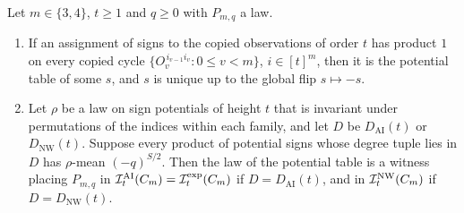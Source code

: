 \begin{lemma}\label{lem:potentials}
Let $m\in\{3,4\}$, $t\ge1$ and $q\ge0$ with $P_{m,q}$ a law.
\begin{enumerate}[label=(\roman*),nosep]
\item If an assignment of signs to the copied observations of order $t$ has product $1$ on every copied cycle $\{O_v^{\,i_{v-1}i_v}:0\le v<m\}$, $i\in[t]^m$, then it is the potential table of some $s$, and $s$ is unique up to the global flip $s\mapsto-s$.
\item Let $\rho$ be a law on sign potentials of height $t$ that is invariant under permutations of the indices within each family, and let $D$ be $D_{\mathrm{AI}}(t)$ or $D_{\mathrm{NW}}(t)$. Suppose every product of potential signs whose degree tuple lies in $D$ has $\rho$-mean $(-q)^{S/2}$. Then the law of the potential table is a witness placing $P_{m,q}$ in $\mathcal I^{\mathrm{AI}}_t(C_m)=\mathcal I^{\mathrm{exp}}_t(C_m)$ if $D=D_{\mathrm{AI}}(t)$, and in $\mathcal I^{\mathrm{NW}}_t(C_m)$ if $D=D_{\mathrm{NW}}(t)$.
\end{enumerate}
\end{lemma}

